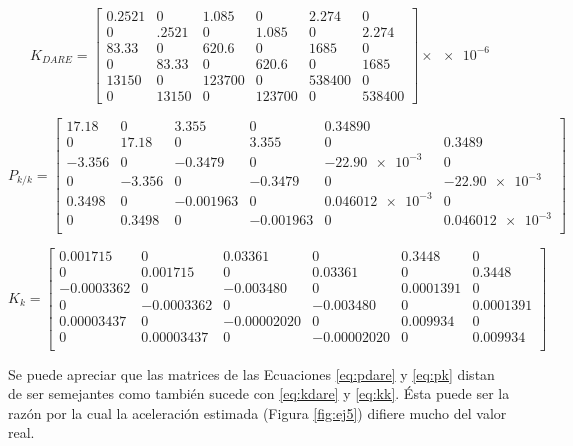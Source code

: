 	\begin{equation}
	K_{\textit{DARE}} = \begin{bmatrix} \num{0.2521}&0&\num{1.085}&0&\num{2.274}&0\\[0.3em] 0&\num{.2521}&0&\num{1.085}&0&\num{2.274}\\[0.3em] \num{83.33}&0&\num{620.6}&0&\num{1685}&0\\[0.3em] 0&\num{83.33}&0&\num{620.6}&0&\num{1685}\\[0.3em] \num{13150}&0&\num{123700}&0&\num{538400}&0\\[0.3em] 0&\num{13150}&0&\num{123700}&0&\num{538400}\end{bmatrix}\times\num{e-6}
		\label{eq:kdare}
	\end{equation}

	\begin{equation}
	P_{k/k} = \begin{bmatrix}\num{17.18}&0&\num{3.355}&0&\num{0.3489}0\\[0.3em] 0&\num{17.18}&0&\num{3.355}&0&\num{0.3489}\\[0.3em] \num{-3.356}&0&\num{-0.3479}&0&\num{-22.90e-3}&0\\[0.3em]0&\num{-3.356}&0&\num{-0.3479}&0&\num{-22.90e-3}\\[0.3em] \num{0.3498}&0&\num{-0.001963}&0&\num{0.046012e-3}&0\\[0.3em] 0&\num{0.3498}&0&\num{-0.001963}&0&\num{0.046012e-3}\\[0.3em]\end{bmatrix}
		\label{eq:pk}
	\end{equation}

	\begin{equation}
	K_k = \begin{bmatrix} \num{0.001715}&0&\num{0.03361}&0&\num{0.3448}&0\\[0.3em] 0&\num{0.001715}&0&\num{0.03361}&0&\num{0.3448}\\[0.3em] \num{-0.0003362}&0&\num{-0.003480}&0&\num{0.0001391}&0\\[0.3em] 0&\num{-0.0003362}&0&\num{-0.003480}&0&\num{0.0001391}\\[0.3em] \num{0.00003437}&0&\num{-0.00002020}&0&\num{0.009934}&0\\[0.3em] 0&\num{0.00003437}&0&\num{-0.00002020}&0&\num{0.009934}\\[0.3em] \end{bmatrix}
		\label{eq:kk}
	\end{equation}

	Se puede apreciar que las matrices de las Ecuaciones \eqref{eq:pdare} y \eqref{eq:pk} distan de ser semejantes como también sucede con \eqref{eq:kdare} y \eqref{eq:kk}. Ésta puede ser la razón por la cual la aceleración estimada (Figura \ref{fig:ej5}) difiere mucho del valor real.
	

